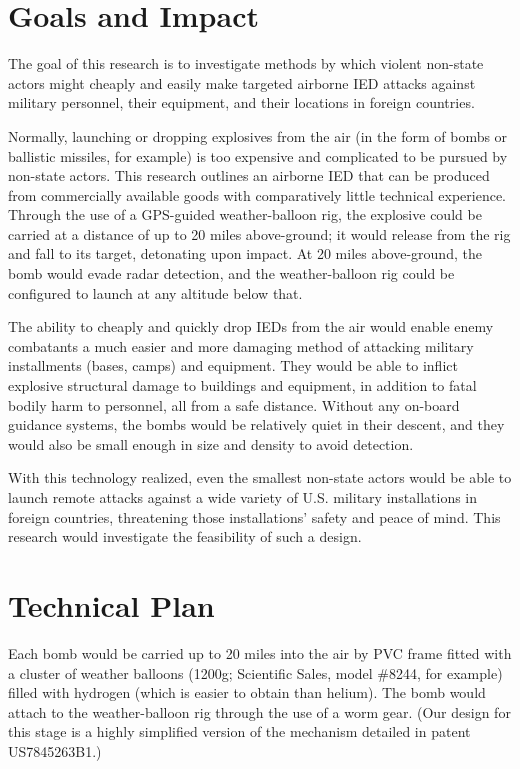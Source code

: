 \documentclass[12pt]{article}
\begin{document}
\section{Goals and Impact}

The goal of this research is to investigate methods by
which violent non-state actors might cheaply and easily make
targeted airborne IED attacks against military personnel, their
equipment, and their locations in foreign countries.

Normally, launching or dropping explosives from the air (in the
form of bombs or ballistic missiles, for example) is too expensive
and complicated to be pursued by non-state actors. This research outlines
an airborne IED that can be produced from commercially available goods
with comparatively little technical experience. Through the use of a
GPS-guided weather-balloon rig, the explosive could be carried at a
distance of up to 20 miles above-ground; it would release from the rig
and fall to its target, detonating upon impact. At 20 miles above-ground,
the bomb would evade radar detection, and the weather-balloon rig could be
configured to launch at any altitude below that.

The ability to cheaply and quickly drop IEDs from the air would enable enemy
combatants a much easier and more damaging method of attacking military
installments (bases, camps) and equipment. They would be able to inflict
explosive structural damage to buildings and equipment, in addition to
fatal bodily harm to personnel, all from a safe distance. Without any on-board
guidance systems, the bombs would be relatively quiet in their descent, and they
would also be small enough in size and density to avoid detection.

With this technology realized, even the smallest non-state actors would be able
to launch remote attacks against a wide variety of U.S. military installations
in foreign countries, threatening those installations' safety and peace of mind.
This research would investigate the feasibility of such a design.

\section{Technical Plan}

Each bomb would be carried up to 20 miles into the air by PVC frame fitted
with a cluster of weather balloons (1200g; Scientific Sales, model \#8244,
for example) filled with hydrogen (which is easier to obtain than helium).
The bomb would attach to the weather-balloon rig through the use of a worm
gear. (Our design for this stage is a highly simplified version of the mechanism
detailed in patent US7845263B1.)
\end{document}
